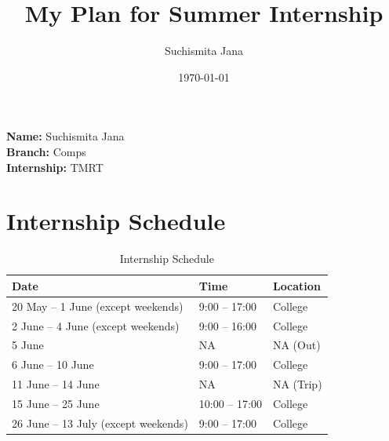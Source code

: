 \documentclass{article}
\title{\textbf{My Plan for Summer Internship}}
\author{Suchismita Jana}
\date{\today}
\begin{document}
	\maketitle
	
	\noindent \textbf{Name:} Suchismita Jana \\
	\textbf{Branch:} Comps \\
	\textbf{Internship:} TMRT \\
	
	\section{Internship Schedule}
	
	\begin{table}[h]
		\centering
		\begin{tabular}{|l|l|l|}
			\hline
			\textbf{Date} & \textbf{Time} & \textbf{Location} \\
			\hline
			20 May -- 1 June (except weekends) & 9:00 -- 17:00 & College \\
			\hline
			2 June -- 4 June (except weekends) & 9:00 -- 16:00 & College \\
			\hline
			5 June & NA & NA (Out) \\
			\hline
			6 June -- 10 June & 9:00 -- 17:00 & College
			\\
			\hline
			11 June -- 14 June & NA & NA (Trip) 
			\\
			\hline
			15 June -- 25 June & 10:00 -- 17:00 & College \\
			\hline
			26 June -- 13 July (except weekends) & 9:00 -- 17:00 & College \\
			\hline
		\end{tabular}
		\caption{Internship Schedule}
	\end{table}
	
\end{document}
